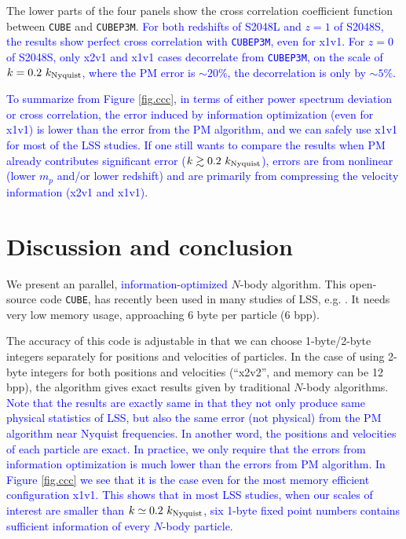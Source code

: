 \documentclass[10pt,twocolumn,preprint]{emulateapj}
\newcommand{\tcb}{\textcolor{blue}}
\begin{document}
The lower parts of the four panels show the cross correlation coefficient function between {\tt CUBE} and {\tt CUBEP3M}. \tcb{For both redshifts of S2048L and $z=1$ of S2048S, the results show perfect cross correlation with {\tt CUBEP3M}, even for x1v1. For $z=0$ of S2048S, only x2v1 and x1v1 cases decorrelate from {\tt CUBEP3M}, on the scale of $k=0.2\ k_{\rm Nyquist}$, where the PM error is $\sim 20\%$, the decorrelation is only by $\sim 5\%$.}

\tcb{To summarize from Figure \ref{fig.ccc}, in terms of either power spectrum deviation or cross correlation, the error induced by information optimization (even for x1v1) is lower than the error from the PM algorithm, and we can safely use x1v1 for most of the LSS studies. If one still wants to compare the results when PM already contributes significant error ($k\gtrsim 0.2\ k_{\rm Nyquist}$), errors are from nonlinear (lower $m_p$ and/or lower redshift) and are primarily from compressing the velocity information (x2v1 and x1v1).}


\section{Discussion and conclusion}\label{s.discussion}
We present an parallel, \tcb{information-optimized} $N$-body algorithm. This open-source code {\tt CUBE}, has recently been used in many studies of LSS, e.g. \cite{2017PhRvD..95d3501Y,2017ApJ...841L..29W,2017MNRAS.469.1968P}. It needs very low memory usage, approaching 6 byte per particle (6 bpp).

The accuracy of this code is adjustable in that we can choose 1-byte/2-byte integers separately for positions and velocities of particles. In the case of using 2-byte integers for both positions and velocities (``x2v2'', and memory can be 12 bpp), the algorithm gives exact results given by traditional $N$-body algorithms. \tcb{Note that the results are exactly same in that they not only produce same physical statistics of LSS, but also the same error (not physical) from the PM algorithm near Nyquist frequencies. In another word, the positions and velocities of each particle are exact. In practice, we only require that the errors from information optimization is much lower than the errors from PM algorithm. In Figure \ref{fig.ccc} we see that it is the case even for the most memory efficient configuration x1v1. This shows that in most LSS studies, when our scales of interest are smaller than $k\simeq 0.2\ k_{\rm Nyquist}$, six 1-byte fixed point numbers contains sufficient information of every $N$-body particle.}
\end{document}
